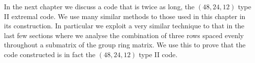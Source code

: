 In the next chapter we discuss a code that is twice as long, the $(48,24,12)$ type II extremal code.
We use many similar methods to those used in this chapter in its construction.
In particular we exploit a very similar technique to that in the last few sections where we analyse the combination of three rows spaced evenly throughout a submatrix of the group ring matrix.
We use this to prove that the code constructed is in fact the $(48,24,12)$ type II code.